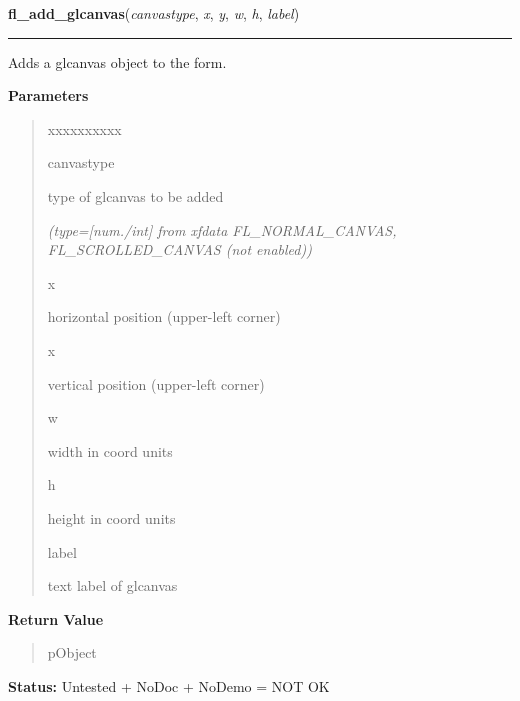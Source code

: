 \hspace{.8\funcindent}\begin{boxedminipage}{\funcwidth}

    \raggedright \textbf{fl\_add\_glcanvas}(\textit{canvastype}, \textit{x}, \textit{y}, \textit{w}, \textit{h}, \textit{label})

    \vspace{-1.5ex}

    \rule{\textwidth}{0.5\fboxrule}
\setlength{\parskip}{2ex}
    Adds a glcanvas object to the form.

\setlength{\parskip}{1ex}
      \textbf{Parameters}
      \vspace{-1ex}

      \begin{quote}
        \begin{Ventry}{xxxxxxxxxx}

          \item[canvastype]

          type of glcanvas to be added

            {\it (type=[num./int] from xfdata FL\_NORMAL\_CANVAS, FL\_SCROLLED\_CANVAS (not 
enabled))}

          \item[x]

          horizontal position (upper-left corner)

          \item[x]

          vertical position (upper-left corner)

          \item[w]

          width in coord units

          \item[h]

          height in coord units

          \item[label]

          text label of glcanvas

        \end{Ventry}

      \end{quote}

      \textbf{Return Value}
    \vspace{-1ex}

      \begin{quote}
      pObject

      \end{quote}

\textbf{Status:} Untested + NoDoc + NoDemo = NOT OK



    \end{boxedminipage}

